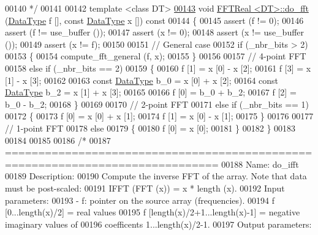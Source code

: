 \begin{DoxyCode}
00140 \textcolor{comment}{*/}
00141 
00142 \textcolor{keyword}{template} <\textcolor{keyword}{class} DT>
\hypertarget{a00096_source_l00143}{}\hyperlink{a00010_a4c5b863a285c5a87f38517735cbf1352}{00143} \textcolor{keywordtype}{void}    \hyperlink{a00010}{FFTReal <DT>::do\_fft} (\hyperlink{a00010_a606148f1cf8c3b7d705473932fc063d1}{DataType} f [], \textcolor{keyword}{const} 
      \hyperlink{a00010_a606148f1cf8c3b7d705473932fc063d1}{DataType} x []) \textcolor{keyword}{const}
00144 \{
00145     assert (f != 0);
00146     assert (f != use\_buffer ());
00147     assert (x != 0);
00148     assert (x != use\_buffer ());
00149     assert (x != f);
00150 
00151     \textcolor{comment}{// General case}
00152     \textcolor{keywordflow}{if} (\_nbr\_bits > 2)
00153     \{
00154         compute\_fft\_general (f, x);
00155     \}
00156 
00157     \textcolor{comment}{// 4-point FFT}
00158     \textcolor{keywordflow}{else} \textcolor{keywordflow}{if} (\_nbr\_bits == 2)
00159     \{
00160         f [1] = x [0] - x [2];
00161         f [3] = x [1] - x [3];
00162 
00163         \textcolor{keyword}{const} \hyperlink{a00010_a606148f1cf8c3b7d705473932fc063d1}{DataType}  b\_0 = x [0] + x [2];
00164         \textcolor{keyword}{const} \hyperlink{a00010_a606148f1cf8c3b7d705473932fc063d1}{DataType}  b\_2 = x [1] + x [3];
00165         
00166         f [0] = b\_0 + b\_2;
00167         f [2] = b\_0 - b\_2;
00168     \}
00169 
00170     \textcolor{comment}{// 2-point FFT}
00171     \textcolor{keywordflow}{else} \textcolor{keywordflow}{if} (\_nbr\_bits == 1)
00172     \{
00173         f [0] = x [0] + x [1];
00174         f [1] = x [0] - x [1];
00175     \}
00176 
00177     \textcolor{comment}{// 1-point FFT}
00178     \textcolor{keywordflow}{else}
00179     \{
00180         f [0] = x [0];
00181     \}
00182 \}
00183 
00184 
00185 
00186 \textcolor{comment}{/*}
00187 \textcolor{comment}{==============================================================================}
00188 \textcolor{comment}{Name: do\_ifft}
00189 \textcolor{comment}{Description:}
00190 \textcolor{comment}{    Compute the inverse FFT of the array. Note that data must be post-scaled:}
00191 \textcolor{comment}{    IFFT (FFT (x)) = x * length (x).}
00192 \textcolor{comment}{Input parameters:}
00193 \textcolor{comment}{    - f: pointer on the source array (frequencies).}
00194 \textcolor{comment}{        f [0...length(x)/2] = real values}
00195 \textcolor{comment}{        f [length(x)/2+1...length(x)-1] = negative imaginary values of}
00196 \textcolor{comment}{        coefficents 1...length(x)/2-1.}
00197 \textcolor{comment}{Output parameters:}

\end{DoxyCode}

